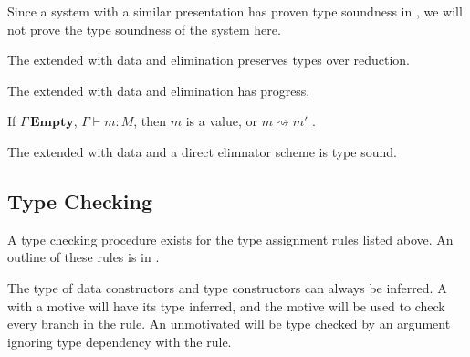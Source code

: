 Since a system with a similar presentation has proven type soundness in \cite{sjoberg2012irrelevance},
we will not prove the type soundness of the system here.

\begin{claim} The \slang{} extended with data and elimination preserves types over reduction.
\end{claim}

\begin{claim} The \slang{} extended with data and elimination has progress.

If $\Gamma\,\mathbf{Empty}$, \textup{$\Gamma\vdash m:M$}, then $m$ is a value, or $m\rightsquigarrow m'$ .
\end{claim}

\begin{claim}
The \slang{} extended with data and a direct elimnator scheme is type sound.
\end{claim}

\subsection{\Bidir{} Type Checking}

A \bidir{} type checking procedure exists for the type assignment rules listed above.
An outline of these rules is in .

The type of data constructors and type constructors can always be inferred.
A \case{} with a motive will have its type inferred, and the motive will be used to check every branch in the  rule.
An unmotivated \case{} will be type checked by an argument ignoring type dependency with the  rule.

